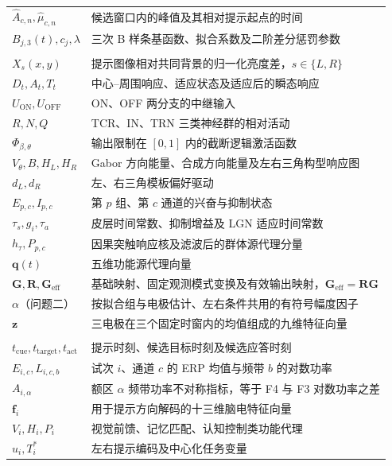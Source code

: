 \begin{longtable}{@{}>{\raggedright\arraybackslash}p{}>{\raggedright\arraybackslash}p{}@{}}
\(\hat A_{c,n},\hat\mu_{c,n}\) & 候选窗口内的峰值及其相对提示起点的时间 \\
\(B_{j,3}(t),c_j,\lambda\) & 三次 B 样条基函数、拟合系数及二阶差分惩罚参数 \\
\midrule
\multicolumn{2}{l}{\textbf{视觉刺激正向计算}}\\
\(X_s(x,y)\) & 提示图像相对共同背景的归一化亮度差，\(s\in\{L,R\}\) \\
\(D_t,A_t,T_t\) & 中心--周围响应、适应状态及适应后的瞬态响应 \\
\(U_{\mathrm{ON}},U_{\mathrm{OFF}}\) & ON、OFF 两分支的中继输入 \\
\(R,N,Q\) & TCR、IN、TRN 三类神经群的相对活动 \\
\(\Phi_{\beta,\theta}\) & 输出限制在 \([0,1]\) 内的截断逻辑激活函数 \\
\(V_\theta,B,H_L,H_R\) & Gabor 方向能量、合成方向能量及左右三角构型响应图 \\
\(d_L,d_R\) & 左、右三角模板偏好驱动 \\
\(E_{p,c},I_{p,c}\) & 第 \(p\) 组、第 \(c\) 通道的兴奋与抑制状态 \\
\(\tau_s,g_i,\tau_a\) & 皮层时间常数、抑制增益及 LGN 适应时间常数 \\
\(h_\tau,P_{p,c}\) & 因果突触响应核及滤波后的群体源代理分量 \\
\(\mathbf q(t)\) & 五维功能源代理向量 \\
\(\mathbf G,\mathbf R,\mathbf G_{\mathrm{eff}}\) & 基础映射、固定观测模式变换及有效输出映射，\(\mathbf G_{\mathrm{eff}}=\mathbf R\mathbf G\) \\
\(\alpha\)（问题二） & 按拟合组与电极估计、左右条件共用的有符号幅度因子 \\
\(\mathbf z\) & 三电极在三个固定时窗内的均值组成的九维特征向量 \\
\midrule
\multicolumn{2}{l}{\textbf{认知功能代理与评价指标}}\\
\(t_{\mathrm{cue}},t_{\mathrm{target}},t_{\mathrm{act}}\) & 提示时刻、候选目标时刻及候选应答时刻 \\
\(E_{i,c},L_{i,c,b}\) & 试次 \(i\)、通道 \(c\) 的 ERP 均值与频带 \(b\) 的对数功率 \\
\(A_{i,\alpha}\) & 额区 \(\alpha\) 频带功率不对称指标，等于 F4 与 F3 对数功率之差 \\
\(\mathbf f_i\) & 用于提示方向解码的十三维脑电特征向量 \\
\(V_i,H_i,P_i\) & 视觉前馈、记忆匹配、认知控制类功能代理 \\
\(u_i,T_i^*\) & 左右提示编码及中心化任务变量 \\

\end{longtable}
